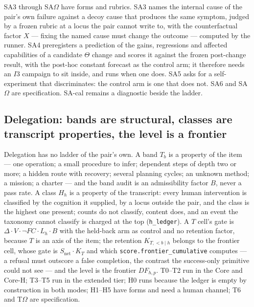 \documentclass[11pt]{article}
\theoremstyle{definition}
\begin{document}
SA3 through SA$\Omega$ have forms and rubrics. SA3 names the internal cause of the pair's own failure against a decoy cause that produces the same symptom, judged by a frozen rubric at a locus the pair cannot write to, with the counterfactual factor $X$ --- fixing the named cause must change the outcome --- computed by the runner. SA4 preregisters a prediction of the gains, regressions and affected capabilities of a candidate $\Theta$ change and scores it against the frozen post-change result, with the post-hoc constant forecast as the control arm; it therefore needs an $I3$ campaign to sit inside, and runs when one does. SA5 asks for a self-experiment that discriminates: the control arm is one that does not. SA6 and SA$\Omega$ are specification. SA-cal remains a diagnostic beside the ladder.

\subsection{Delegation: bands are structural, classes are transcript properties, the level is a frontier}\label{sec:dicells}
Delegation has no ladder of the pair's own. A band $T_b$ is a property of the item --- one operation; a small procedure to infer; dependent steps of depth two or more; a hidden route with recovery; several planning cycles; an unknown method; a mission; a charter --- and the band audit is an admissibility factor $B$, never a pass rate. A class $H_h$ is a property of the transcript: every human intervention is classified by the cognition it supplied, by a locus outside the pair, and the class is the highest one present; counts do not classify, content does, and an event the taxonomy cannot classify is charged at the top (\texttt{h\_ledger}). A $T$ cell's gate is $\Delta \cdot V \cdot \neg FC \cdot L_h \cdot B$ with the held-back arm as control and no retention factor, because $T$ is an axis of the item; the retention $K_{T,<b \mid h}$ belongs to the frontier cell, whose gate is $S_{\mathrm{net}} \cdot K_T$ and which \texttt{score.frontier\_cumulative} computes --- a refusal must outscore a false completion, the contrast the success-only primitive could not see --- and the level is the frontier $DF_{h,p}$. T0--T2 run in the Core and Core-H; T3--T5 run in the extended tier; H0 runs because the ledger is empty by construction in both modes; H1--H5 have forms and need a human channel; T6 and T$\Omega$ are specification.
\end{document}

